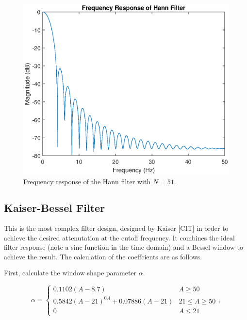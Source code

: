                 \begin{figure}[!th]
                    \includegraphics[width=\textwidth]{Images/ha_filter.eps}
                    \centering
                    \caption{Frequency response of the Hann filter with $N=51$.}
                    \label{img_ha_filter}
                \end{figure}  

            \subsection{Kaiser-Bessel Filter}

                This is the most complex filter design, designed by Kaiser [CIT] in order to achieve the desired attenutation at the cutoff frequency. It combines the ideal filter response (note a sinc function in the time domain) and a Bessel window to achieve the result. The calculation of the coeffcients are as follows.

                First, calculate the window shape parameter $\alpha$. 

                \begin{equation}
                    \alpha = 
                        \begin{cases}
                            0.1102(A - 8.7) & A \ge 50 \\
                            0.5842(A-21)^{0.4} + 0.07886(A-21) & 21 \leq A \geq 50 \\
                            0 & A \le 21
                        \end{cases},
                \end{equation}

